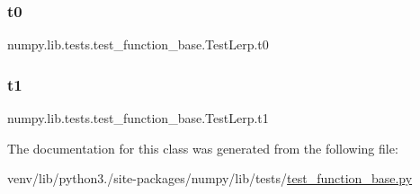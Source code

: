 \subsubsection{\texorpdfstring{t0}{t0}}
{\footnotesize\ttfamily numpy.\+lib.\+tests.\+test\+\_\+function\+\_\+base.\+Test\+Lerp.\+t0\hspace{0.3cm}{\ttfamily [static]}}

\mbox{\label{classnumpy_1_1lib_1_1tests_1_1test__function__base_1_1TestLerp_aebb5433a000c1cdf987621b19a5cca7e}} 
\subsubsection{\texorpdfstring{t1}{t1}}
{\footnotesize\ttfamily numpy.\+lib.\+tests.\+test\+\_\+function\+\_\+base.\+Test\+Lerp.\+t1\hspace{0.3cm}{\ttfamily [static]}}



The documentation for this class was generated from the following file\+:\begin{DoxyCompactItemize}
\item 
venv/lib/python3./site-\/packages/numpy/lib/tests/\hyperlink{lib_2tests_2test__function__base_8py}{test\+\_\+function\+\_\+base.\+py}\end{DoxyCompactItemize}
